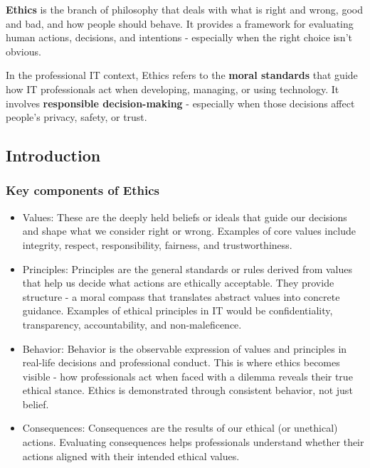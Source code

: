 \indent

\textbf{Ethics} is the branch of philosophy that deals with what is right and wrong, good and bad, and how people should behave. It provides a framework for evaluating human actions, decisions, and intentions - especially when the right choice isn’t obvious.

In the professional IT context, Ethics refers to the \textbf{moral standards} that guide how IT professionals act when developing, managing, or using technology. It involves \textbf{responsible decision-making} - especially when those decisions affect people’s privacy, safety, or trust.

\subsection{Introduction}

\subsubsection{Key components of Ethics}

\indent 

\begin{itemize}
    \item Values: These are the deeply held beliefs or ideals that guide our decisions and shape what we consider right or wrong. Examples of core values include integrity, respect, responsibility, fairness, and trustworthiness.
    \item Principles: Principles are the general standards or rules derived from values that help us decide what actions are ethically acceptable. They provide structure - a moral compass that translates abstract values into concrete guidance. Examples of ethical principles in IT would be confidentiality, transparency, accountability, and non-maleficence.
    \item Behavior: Behavior is the observable expression of values and principles in real-life decisions and professional conduct. This is where ethics becomes visible - how professionals act when faced with a dilemma reveals their true ethical stance. Ethics is demonstrated through consistent behavior, not just belief.
    \item Consequences: Consequences are the results of our ethical (or unethical) actions. Evaluating consequences helps professionals understand whether their actions aligned with their intended ethical values.
\end{itemize}

